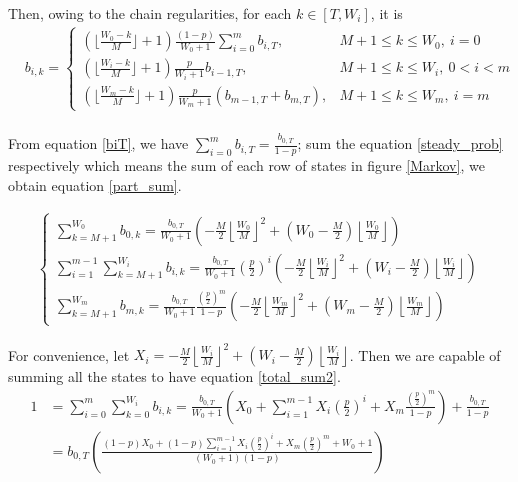 Then, owing to the chain regularities, for each $k\in [T, W_i]$, it is 
\begin{align}
&b_{i,k} = 
\begin{cases}
(\lfloor \frac{W_0-k}{M} \rfloor+1)\frac{(1-p)}{W_0+1}\sum_{i=0}^m b_{i,T}, \  &M+1\leq k\leq W_0,\ i = 0\\[3pt] \nonumber
(\lfloor \frac{W_i-k}{M} \rfloor+1)\frac{p}{W_i+1}b_{i-1,T}, 				\	& M+1 \leq k\leq W_i, \ 0<i<m \\[3pt]
(\lfloor \frac{W_m-k}{M} \rfloor+1)\frac{p}{W_m+1} (b_{m-1,T}+b_{m,T}),  & M+1 \leq k\leq W_m, \ i = m \nonumber 	
\end{cases}
\\
\label{steady_prob}
\end{align}

From equation \ref{biT}, we have $\sum_{i=0}^m b_{i,T}= \frac{b_{0,T}}{1-p}$; sum the equation \ref{steady_prob} respectively which means the sum of each row of states in figure \ref{Markov}, we obtain equation \ref{part_sum}.  

\begin{align}
\begin{cases}
\sum_{k=M+1}^{W_0} b_{0,k} = \frac{b_{0,T}}{W_0+1}\left(-\frac{M}{2}\left\lfloor \frac{W_0}{M}\right\rfloor ^2 + \left(W_0-\frac{M}{2}\right)\left\lfloor \frac{W_0}{M} \right\rfloor \right) \\[3pt]
\sum_{i=1}^{m-1}\sum_{k=M+1}^{W_i} b_{i,k} = \frac{b_{0,T}}{W_0+1}\left(\frac{p}{2}\right)^i \left(-\frac{M}{2}\left\lfloor \frac{W_i}{M}\right\rfloor ^2 + \left(W_i-\frac{M}{2}\right)\left\lfloor \frac{W_i}{M} \right\rfloor \right) \\[3pt]
\sum_{k=M+1}^{W_m} b_{m,k} = \frac{b_{0,T}}{W_0+1}\frac{(\frac{p}{2})^m}{1-p}\left(-\frac{M}{2}\left\lfloor \frac{W_m}{M}\right\rfloor ^2 + \left(W_m-\frac{M}{2}\right)\left\lfloor \frac{W_m}{M} \right\rfloor \right) 
\end{cases}
\label{part_sum}
\end{align}

For convenience, let $X_i = -\frac{M}{2}\left\lfloor \frac{W_i}{M}\right\rfloor ^2 + \left(W_i-\frac{M}{2}\right)\left\lfloor \frac{W_i}{M} \right\rfloor$. Then we are capable of summing all the states to have equation \ref{total_sum2}.
\begin{align}
1 &= \sum_{i=0}^m \sum_{k=0}^{W_i}b_{i,k} 
 = \frac{b_{0,T}}{W_0+1}\left( X_0 + \sum_{i=1}^{m-1}X_i\left( \frac{p}{2}\right)^i + X_m\frac{\left( \frac{p}{2}\right)^m}{1-p}\right) + \frac{b_{0,T}}{1-p}\label{total_sum}\\
& = b_{0,T}\left( \frac{(1-p)X_0+(1-p) \sum_{i=1}^{m-1}X_i\left( \frac{p}{2}\right)^i+X_m\left( \frac{p}{2}\right)^m+W_0+1}{(W_0+1)(1-p)}\right)\label{total_sum2}
\end{align}

